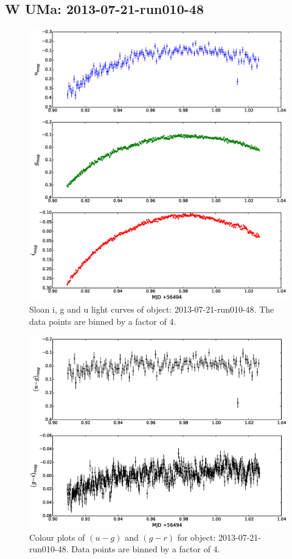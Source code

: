 \subsection{{W UMa}: 2013-07-21-run010-48}

\begin{figure}
  \includegraphics[width=120mm]{images/2013-07-21-run010-48_lightcurve-bin4.eps} 
  \caption{Sloan i, g and u light curves of object: 2013-07-21-run010-48. The data points are binned by a factor of 4.}
  \label{fig:2013-07-21-run010-48}
\end{figure}

\begin{figure}
  \center
  \includegraphics[width=120mm]{images/2013-07-21-run010-48_colourcurve-bin4.eps}
  \caption{Colour plots of $(u-g)$ and $(g-r)$ for object: 2013-07-21-run010-48. Data points are binned by a factor of 4.}
  \label{fig:2013-07-21-run010-48-colour}
\end{figure}


